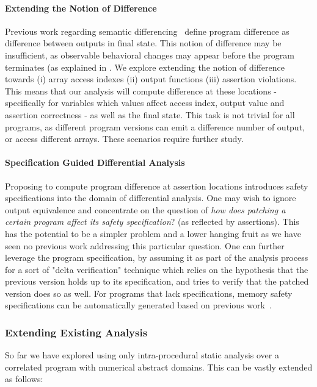\paragraph{Extending the Notion of Difference}
Previous work regarding semantic differencing~\cite{DwyerElbaumPerson08, GodlinStrichman09, EnglerRamos11, HawblitzelKawaguchiLahiriRebelo12} define program difference as difference between outputs in final state. This notion of difference may be insufficient, as observable behavioral changes may appear before the program terminates (as explained in . We explore extending the notion of difference towards (i) array access indexes (ii) output functions (iii) assertion violations. This means that our analysis will compute difference at these locations - specifically for variables which values affect access index, output value and assertion correctness - as well as the final state. This task is not trivial for all programs, as different program versions can emit a difference number of output, or access different arrays. These scenarios require further study.

\paragraph{Specification Guided Differential Analysis}
Proposing to compute program difference at assertion locations introduces safety specifications into the domain of differential analysis. One may wish to ignore output equivalence and concentrate on the question of \emph{how does patching a certain program affect its safety specification}? (as reflected by assertions). This has the potential to be a simpler problem and a lower hanging fruit as we have seen no previous work addressing this particular question. One can further leverage the program specification, by assuming it as part of the analysis process for a sort of "delta verification" technique which relies on the hypothesis that the previous version holds up to its specification, and tries to verify that the patched version does so as well. For programs that lack specifications, memory safety specifications can be automatically generated based on previous work~\cite{ConditHarrenMcPeakNeculaWeimer03}.


\subsubsection{Extending Existing Analysis}

So far we have explored using only intra-procedural static analysis over a correlated program with numerical abstract domains. This can be vastly extended as follows:

